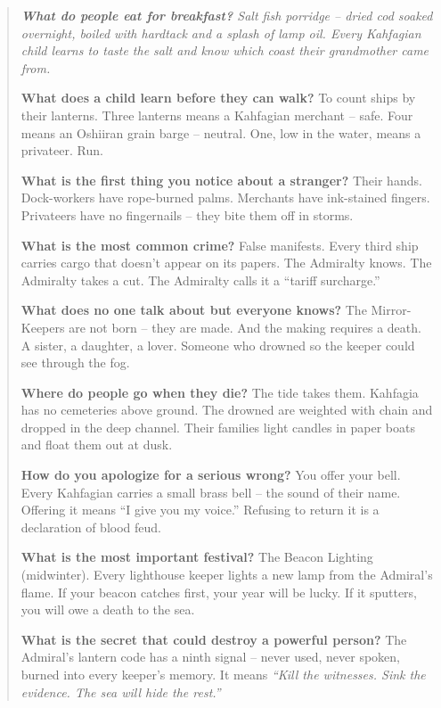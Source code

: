 \documentclass[12pt,oneside]{book}
\newenvironment{almanac}
  {\begin{quote}\small\itshape}
  {\end{quote}}
\begin{document}
\begin{almanac}
\textbf{What do people eat for breakfast?} Salt fish porridge -- dried cod soaked overnight, boiled with hardtack and a splash of lamp oil. Every Kahfagian child learns to taste the salt and know which coast their grandmother came from.

\textbf{What does a child learn before they can walk?} To count ships by their lanterns. Three lanterns means a Kahfagian merchant -- safe. Four means an Oshiiran grain barge -- neutral. One, low in the water, means a privateer. Run.

\textbf{What is the first thing you notice about a stranger?} Their hands. Dock-workers have rope-burned palms. Merchants have ink-stained fingers. Privateers have no fingernails -- they bite them off in storms.

\textbf{What is the most common crime?} False manifests. Every third ship carries cargo that doesn't appear on its papers. The Admiralty knows. The Admiralty takes a cut. The Admiralty calls it a ``tariff surcharge.''

\textbf{What does no one talk about but everyone knows?} The Mirror-Keepers are not born -- they are made. And the making requires a death. A sister, a daughter, a lover. Someone who drowned so the keeper could see through the fog.

\textbf{Where do people go when they die?} The tide takes them. Kahfagia has no cemeteries above ground. The drowned are weighted with chain and dropped in the deep channel. Their families light candles in paper boats and float them out at dusk.

\textbf{How do you apologize for a serious wrong?} You offer your bell. Every Kahfagian carries a small brass bell -- the sound of their name. Offering it means ``I give you my voice.'' Refusing to return it is a declaration of blood feud.

\textbf{What is the most important festival?} The Beacon Lighting (midwinter). Every lighthouse keeper lights a new lamp from the Admiral's flame. If your beacon catches first, your year will be lucky. If it sputters, you will owe a death to the sea.

\textbf{What is the secret that could destroy a powerful person?} The Admiral's lantern code has a ninth signal -- never used, never spoken, burned into every keeper's memory. It means \textit{``Kill the witnesses. Sink the evidence. The sea will hide the rest.''}
\end{almanac}
\end{document}
